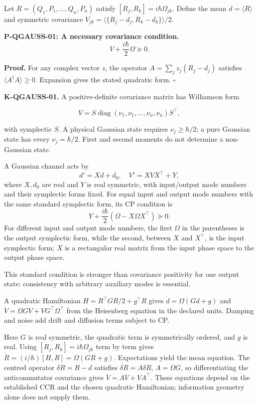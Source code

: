 \documentclass[
  11pt,
  oneside]{book}
\begin{document}
Let \(R=(Q_1,P_1,\ldots,Q_n,P_n)\) satisfy
\([R_j,R_k]=i\hbar\Omega_{jk}\). Define the mean \(d=\langle R\rangle\)
and symmetric covariance \(V_{jk}=\langle\{R_j-d_j,R_k-d_k\}\rangle/2\).

\label{p-qgauss-01}{}

\textbf{P-QGAUSS-01: A necessary covariance condition.} \[
V+\frac{i\hbar}{2}\Omega\succeq0.
\]

\textbf{Proof.} For any complex vector \(z\), the operator
\(A=\sum_jz_j(R_j-d_j)\) satisfies \(\langle A^\dagger A\rangle\ge0\).
Expansion gives the stated quadratic form. \(\square\)

\textbf{K-QGAUSS-01.} A positive-definite covariance matrix has
Williamson form

\[
V=S\operatorname{diag}(\nu_1,\nu_1,\ldots,\nu_n,\nu_n)S^\top,
\]

with symplectic \(S\). A physical Gaussian state requires
\(\nu_j\ge\hbar/2\); a pure Gaussian state has every \(\nu_j=\hbar/2\).
First and second moments do not determine a non-Gaussian state.

A Gaussian channel acts by \[
d'=Xd+d_0,\quad V'=XVX^\top+Y,
\] where \(X,d_0\) are real and \(Y\) is real symmetric, with
input/output mode numbers and their symplectic forms fixed. For equal
input and output mode numbers with the same standard symplectic form,
its CP condition is \[
Y+\frac{i\hbar}{2}(\Omega-X\Omega X^\top)\succeq0.
\] For different input and output mode numbers, the first \(\Omega\) in
the parentheses is the output symplectic form, while the second, between
\(X\) and \(X^\top\), is the input symplectic form; \(X\) is a
rectangular real matrix from the input phase space to the output phase
space.

This standard condition is stronger than covariance positivity for one
output state: consistency with arbitrary auxiliary modes is essential.

A quadratic Hamiltonian \(H=R^\top GR/2+g^\top R\) gives
\(\dot d=\Omega(Gd+g)\) and \(\dot V=\Omega GV+VG^\top\Omega^\top\) from
the Heisenberg equation in the declared units. Damping and noise add
drift and diffusion terms subject to CP.

Here \(G\) is real symmetric, the quadratic term is symmetrically
ordered, and \(g\) is real. Using \([R_j,R_k]=i\hbar\Omega_{jk}\) term
by term gives \(\dot R=(i/\hbar)[H,R]=\Omega(GR+g)\). Expectations yield
the mean equation. The centred operator \(\delta R=R-d\) satisfies
\(\dot{\delta R}=A\delta R\), \(A=\Omega G\), so differentiating the
anticommutator covariance gives \(\dot V=AV+VA^\top\). These equations
depend on the established CCR and the chosen quadratic Hamiltonian;
information geometry alone does not supply them.
\end{document}
